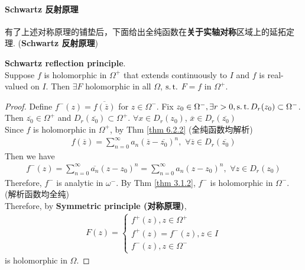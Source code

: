 \paragraph{\textbf{Schwartz} 反射原理}
	有了上述对称原理的铺垫后，下面给出全纯函数在\textbf{关于实轴对称}区域上的延拓定理. (\textbf{Schwartz 反射原理})
	\begin{thm}\label{thm 6.4.2}
		\textbf{Schwartz reflection principle}. \\
		Suppose $f$ is holomorphic in $\Omega^{+}$ that extends continuously to $I$ and $f$ is real-valued on $I$. Then $\exists F$ holomorphic in all $\Omega$, $\operatorname{s.t.}$ $F = f$ in $\Omega^{+}$.
		
		\vspace{2em}
		\begin{proof}
			Define $f^{-}(z) = \overline{f(\overline{z})}$ for $z \in \Omega^{-}$. Fix $z_0 \in \Omega^{-} , \exists r > 0 , \operatorname{s.t.} D_{r}(z_0) \subset \Omega^{-}$.\\
			Then $\overline{z_0} \in \Omega^{+}$ and $D_{r}(\overline{z_0}) \subset \Omega^{+}$. $\forall x \in D_{r}(z_0)$, $\overline{x} \in D_{r}(\overline{z_0})$\\
			Since $f$ is holomorphic in $\Omega^{+}$, by Thm \ref{thm 6.2.2} (全纯函数均解析)
			\begin{align}
				f(\overline{z}) = \sum_{n = 0}^{\infty}{a_n (\overline{z} - \overline{z_0})^n} , \,\, \forall \overline{z} \in D_{r}(\overline{z_0})
			\end{align}
			Then we have
			\begin{align}
				f^{-}(z) = \sum_{n = 0}^{\infty}{\overline{a_n} (z - z_0)^n} = \sum_{n = 0}^{\infty}{a_n (z - z_0)^n} , \,\, \forall z \in D_{r}(z_0)
			\end{align}
			Therefore, $f^{-}$ is analytic in $\omega^{-}$. By Thm \ref{thm 3.1.2}, $f^{-}$ is holomorphic in $\Omega^{-}$. (解析函数均全纯)\\
			Therefore, by \textbf{Symmetric principle (对称原理)}, 
			\begin{align}
				F(z) = 
				\begin{cases}
					f^{+}(z) , z \in \Omega^{+} \\
					f^{+}(z) = f^{-}(z) , z \in I \\
					f^{-}(z) , z \in \Omega^{-}
				\end{cases}
			\end{align}
			is holomorphic in $\Omega$.
		\end{proof}
	\end{thm}

